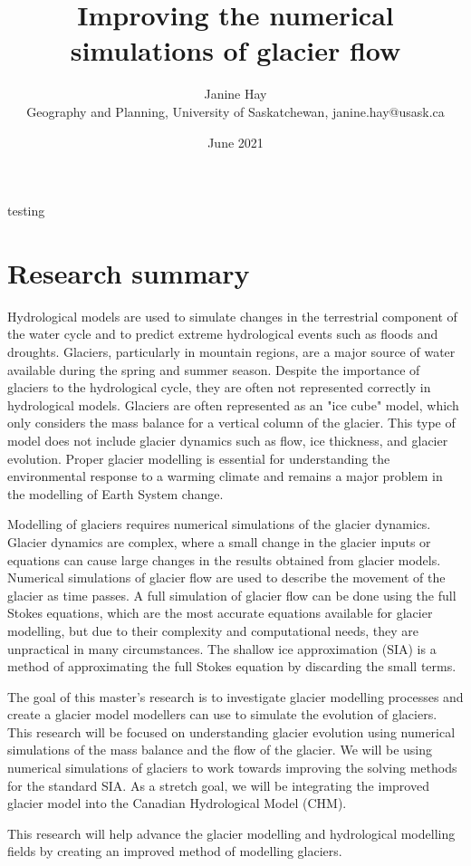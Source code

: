 \documentclass{article}
\title{Improving the numerical simulations of glacier flow}
\author{Janine Hay \\
        \small Geography and Planning, University of Saskatchewan, janine.hay@usask.ca\\

}
\date{June 2021} %
\begin{document}
\maketitle
\newpage
\tableofcontents
\newpage
testing
\section{Research summary}
Hydrological models are used to simulate changes in the terrestrial component of the water cycle and to predict extreme hydrological events such as floods and droughts. Glaciers, particularly in mountain regions, are a major source of water available during the spring and summer season. Despite the importance of glaciers to the hydrological cycle, they are often not represented correctly in hydrological models. Glaciers are often represented as an "ice cube" model, which only considers the mass balance for a vertical column of the glacier. This type of model does not include glacier dynamics such as flow, ice thickness, and glacier evolution. Proper glacier modelling is essential for understanding the environmental response to a warming climate and remains a major problem in the modelling of Earth System change.  

Modelling of glaciers requires numerical simulations of the glacier dynamics. Glacier dynamics are complex, where a small change in the glacier inputs or equations can cause large changes in the results obtained from glacier models. Numerical simulations of glacier flow are used to describe the movement of the glacier as time passes. A full simulation of glacier flow can be done using the full Stokes equations, which are the most accurate equations available for glacier modelling, but due to their complexity and computational needs, they are unpractical in many circumstances. The shallow ice approximation (SIA) is a method of approximating the full Stokes equation by discarding the small terms.

The goal of this master's research is to investigate glacier modelling processes and create a glacier model modellers can use to simulate the evolution of glaciers. This research will be focused on understanding glacier evolution using numerical simulations of the mass balance and the flow of the glacier. We will be using numerical simulations of glaciers to work towards improving the solving methods for the standard SIA. As a stretch goal, we will be integrating the improved glacier model into the Canadian Hydrological Model (CHM).

This research will help advance the glacier modelling and hydrological modelling fields by creating an improved method of modelling glaciers. 
\end{document}
